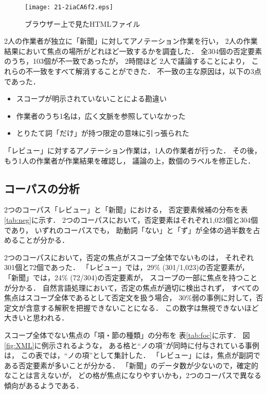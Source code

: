 \documentclass[japanese]{jnlp_1.4}
\begin{document}
\begin{figure}[t]
\begin{center}
\texttt{[image: 21-2iaCA6f2.eps]}
\end{center}
\caption{ブラウザー上で見たHTMLファイル}
\label{fig:HTML}
\end{figure}

2人の作業者が独立に「新聞」に対してアノテーション作業を行い，
2人の作業結果において焦点の場所がどれほど一致するかを調査した．
全304個の否定要素のうち，103個が不一致であったが，
2時間ほど 2人で議論することにより，
これらの不一致をすべて解消することができた．
不一致の主な原因は，以下の3点であった．
\begin{itemize}
\item スコープが明示されていないことによる勘違い
\item 作業者のうち1名は，広く文脈を参照していなかった
\item とりたて詞「だけ」が持つ限定の意味に引っ張られた
\end{itemize}

「レビュー」に対するアノテーション作業は，1人の作業者が行った．
その後，もう1人の作業者が作業結果を確認し，
議論の上，数個のラベルを修正した．


\subsection{コーパスの分析}

2つのコーパス「レビュー」と「新聞」における，
否定要素候補の分布を表\ref{tab:neg}に示す．
2つのコーパスにおいて，否定要素はそれぞれ1,023個と304個であり，
いずれのコーパスでも，
助動詞「ない」と「ず」が全体の過半数を占めることが分かる．

2つのコーパスにおいて，否定の焦点がスコープ全体でないものは，
それぞれ301個と72個であった．
「レビュー」では，29\% (301/1,023)の否定要素が，
「新聞」では，24\% (72/304)の否定要素が，
スコープの一部に焦点を持つことが分かる．
自然言語処理において，否定の焦点が適切に検出されず，
すべての焦点はスコープ全体であるとして否定文を扱う場合，
30\%弱の事例に対して，否定文が含意する解釈を把握できないことになる．
この数字は無視できないほど大きいと思われる．

スコープ全体でない焦点の「項・節の種類」の分布を
表\ref{tab:foc}に示す．
図\ref{fig:XML}に例示されるような，
ある格と``ノの項''が同時に付与されている事例は，
この表では，``ノの項''として集計した．
「レビュー」には，焦点が副詞である否定要素が多いことが分かる．
「新聞」のデータ数が少ないので，確定的なことは言えないが，
どの格が焦点になりやすいかも，2つのコーパスで異なる傾向があるようである．
\end{document}
